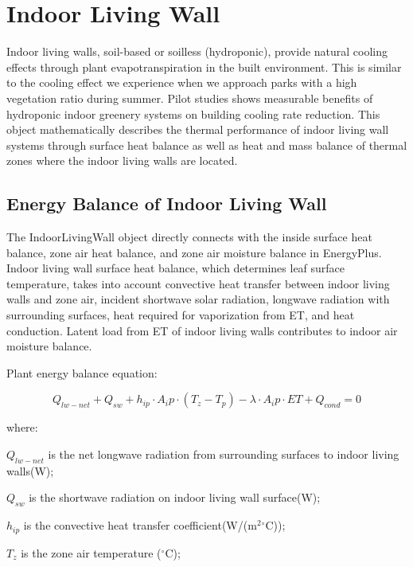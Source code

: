 \section{Indoor Living Wall }\label{indoor-living-wall}

Indoor living walls, soil-based or soilless (hydroponic), provide natural cooling effects through plant evapotranspiration in the built environment. This is similar to the cooling effect we experience when we approach parks with a high vegetation ratio during summer. Pilot studies shows measurable benefits of hydroponic indoor greenery systems on building cooling rate reduction. 
This object mathematically describes the thermal performance of indoor living wall systems  through surface heat balance as well as heat and mass balance of thermal zones where the indoor living walls are located. 

\subsection{Energy Balance of Indoor Living Wall}\label{energy-balance-of-indoor-living-wall}

The IndoorLivingWall object directly connects with the inside surface heat balance, zone air heat balance, and zone air moisture balance in EnergyPlus. Indoor living wall surface heat balance, which determines leaf surface temperature, takes into account convective heat transfer between indoor living walls and zone air, incident shortwave solar radiation, longwave radiation with surrounding surfaces, heat required for vaporization from ET, and heat conduction. Latent load from ET of indoor living walls contributes to indoor air moisture balance. 

Plant energy balance equation:

\begin{equation}
Q_{lw-net}+Q_{sw}+h_{ip} \cdot A_ip \cdot (T_z - T_p )-\lambda \cdot A_ip \cdot ET+Q_{cond}=0          
\end{equation}

where:

\(Q_{lw-net}\) is the net longwave radiation from surrounding surfaces to indoor living walls(W);

\(Q_{sw}\) is the shortwave radiation on indoor living wall surface(W);

\(h_{ip}\) is the convective heat transfer coefficient(W/(m\(^2\)\(^{\circ}\)C));

\(T_z\) is the zone air temperature (\(^{\circ}\)C);

